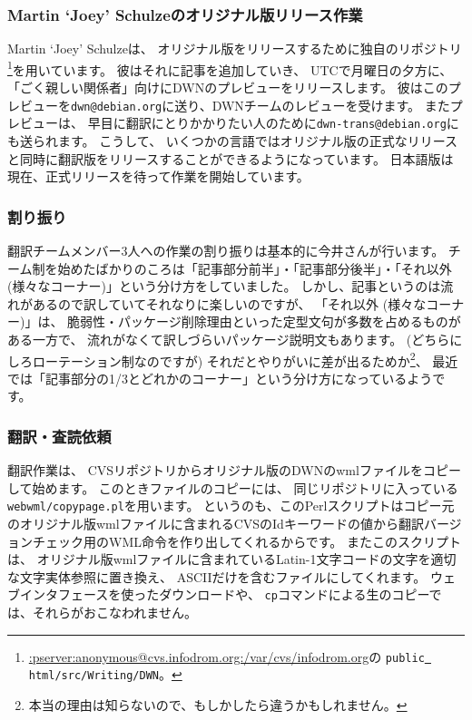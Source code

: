 \documentclass[mingoth,a4paper]{jsarticle}
\begin{document}
\subsubsection{Martin `Joey' Schulzeのオリジナル版リリース作業}

Martin `Joey' Schulzeは、
オリジナル版をリリースするために独自のリポジトリ
\footnote{\url{:pserver:anonymous@cvs.infodrom.org:/var/cvs/infodrom.org}の
\texttt{public\underline{ }html/src/Writing/DWN}。}を用いています。
彼はそれに記事を追加していき、
UTCで月曜日の夕方に、「ごく親しい関係者」向けにDWNのプレビューをリリースします。
彼はこのプレビューを\verb|dwn@debian.org|に送り、DWNチームのレビューを受けます。
またプレビューは、
早目に翻訳にとりかかりたい人のために\verb|dwn-trans@debian.org|にも送られます。
こうして、
いくつかの言語ではオリジナル版の正式なリリースと同時に翻訳版をリリースすることができるようになっています。
日本語版は現在、正式リリースを待って作業を開始しています。

\subsubsection{割り振り}

翻訳チームメンバー3人への作業の割り振りは基本的に今井さんが行います。
チーム制を始めたばかりのころは「記事部分前半」・「記事部分後半」・「それ以外 (様々なコーナー)」という分け方をしていました。
しかし、記事というのは流れがあるので訳していてそれなりに楽しいのですが、
「それ以外 (様々なコーナー)」は、
脆弱性・パッケージ削除理由といった定型文句が多数を占めるものがある一方で、
流れがなくて訳しづらいパッケージ説明文もあります。
(どちらにしろローテーション制なのですが) それだとやりがいに差が出るためか\footnote{本当の理由は知らないので、もしかしたら違うかもしれません。}、
最近では「記事部分の1/3とどれかのコーナー」という分け方になっているようです。

\subsubsection{翻訳・査読依頼}

翻訳作業は、
CVSリポジトリからオリジナル版のDWNのwmlファイルをコピーして始めます。
このときファイルのコピーには、
同じリポジトリに入っている\verb|webwml/copypage.pl|を用います。
というのも、このPerlスクリプトはコピー元のオリジナル版wmlファイルに含まれるCVSのIdキーワードの値から翻訳バージョンチェック用のWML命令を作り出してくれるからです。
またこのスクリプトは、
オリジナル版wmlファイルに含まれているLatin-1文字コードの文字を適切な文字実体参照に置き換え、
ASCIIだけを含むファイルにしてくれます。
ウェブインタフェースを使ったダウンロードや、
\verb|cp|コマンドによる生のコピーでは、それらがおこなわれません。
\end{document}
